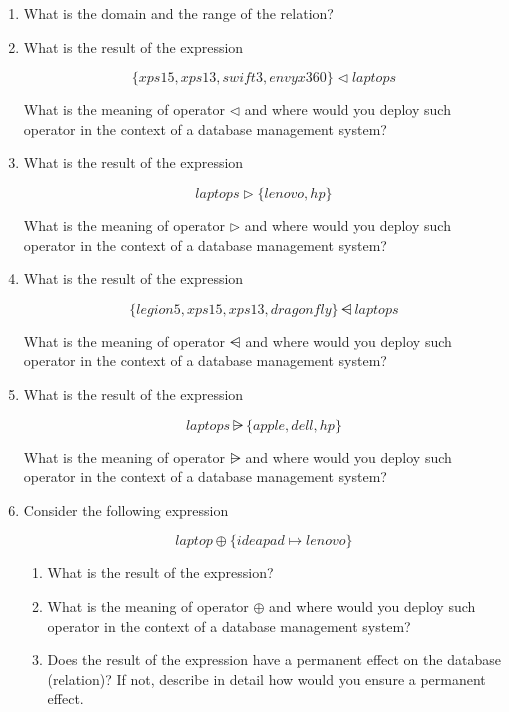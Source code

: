 \begin{enumerate}

\item What is the domain and the range of the relation?\\

\item What is the result of the expression

\[ \{ xps15, xps13, swift3, envyx360 \}  \lhd laptops \]

\noindent What is the meaning of operator $\lhd$ and where would you deploy such operator in the context of a database management system?

\item What is the result of the expression

\[ laptops \rhd \{ lenovo, hp \} \]

\noindent What is the meaning of operator $\rhd$ and where would you deploy such operator in the context of a database management system?

\item What is the result of the expression

\[ \{ legion5, xps15, xps13, dragonfly \} \ndres laptops \]

\noindent What is the meaning of operator $\ndres$ and where would you deploy such operator in the context of a database management system?

\item What is the result of the expression

\[ laptops \nrres \{ apple, dell, hp \} \]

\noindent What is the meaning of operator $\nrres$ and where would you deploy such operator in the context of a database management system?

\item Consider the following expression

\[ laptop \oplus \{ ideapad \mapsto lenovo \} \]

\begin{enumerate}
\item What is the result of the expression?

\item What is the meaning of operator $\oplus$ and where would you deploy such operator in the context of a database management system?

\item Does the result of the expression have a permanent effect on the database (relation)? If not, describe in detail how would you ensure a permanent effect. 

\end{enumerate}

\end{enumerate}


